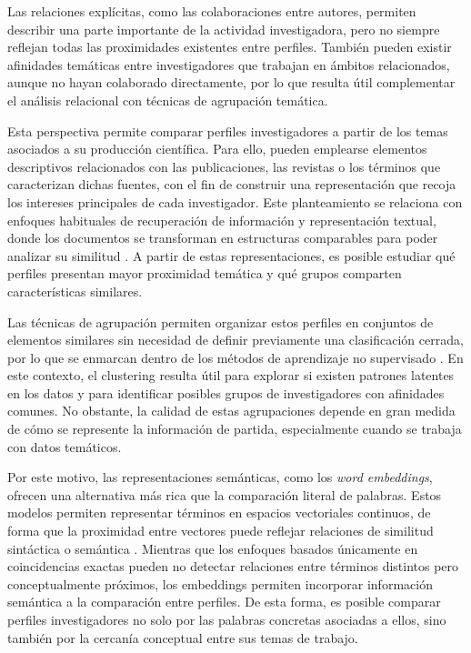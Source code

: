 \documentclass[11pt,spanish,listoffigures,listoftables]{tfgetsinf}
\begin{document}
Las relaciones explícitas, como las colaboraciones entre autores, permiten describir una parte importante de la actividad investigadora, pero no siempre reflejan todas las proximidades existentes entre perfiles. También pueden existir afinidades temáticas entre investigadores que trabajan en ámbitos relacionados, aunque no hayan colaborado directamente, por lo que resulta útil complementar el análisis relacional con técnicas de agrupación temática.

Esta perspectiva permite comparar perfiles investigadores a partir de los temas asociados a su producción científica. Para ello, pueden emplearse elementos descriptivos relacionados con las publicaciones, las revistas o los términos que caracterizan dichas fuentes, con el fin de construir una representación que recoja los intereses principales de cada investigador. Este planteamiento se relaciona con enfoques habituales de recuperación de información y representación textual, donde los documentos se transforman en estructuras comparables para poder analizar su similitud \cite{manning}. A partir de estas representaciones, es posible estudiar qué perfiles presentan mayor proximidad temática y qué grupos comparten características similares.

Las técnicas de agrupación permiten organizar estos perfiles en conjuntos de elementos similares sin necesidad de definir previamente una clasificación cerrada, por lo que se enmarcan dentro de los métodos de aprendizaje no supervisado \cite{hastie}. En este contexto, el clustering resulta útil para explorar si existen patrones latentes en los datos y para identificar posibles grupos de investigadores con afinidades comunes. No obstante, la calidad de estas agrupaciones depende en gran medida de cómo se represente la información de partida, especialmente cuando se trabaja con datos temáticos.

Por este motivo, las representaciones semánticas, como los \textit{word embeddings}, ofrecen una alternativa más rica que la comparación literal de palabras. Estos modelos permiten representar términos en espacios vectoriales continuos, de forma que la proximidad entre vectores puede reflejar relaciones de similitud sintáctica o semántica \cite{mikolov}. Mientras que los enfoques basados únicamente en coincidencias exactas pueden no detectar relaciones entre términos distintos pero conceptualmente próximos, los embeddings permiten incorporar información semántica a la comparación entre perfiles. De esta forma, es posible comparar perfiles investigadores no solo por las palabras concretas asociadas a ellos, sino también por la cercanía conceptual entre sus temas de trabajo.
\end{document}
